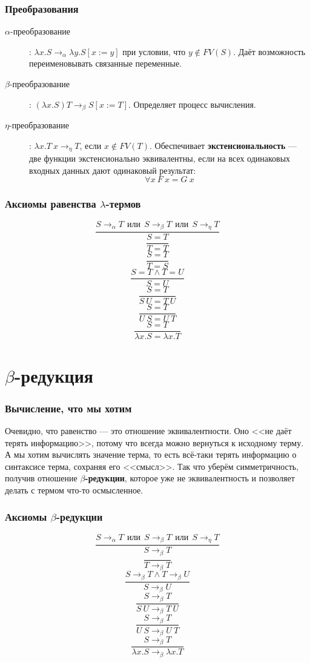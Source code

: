 \documentclass[xetex,mathserif,serif]{beamer}
\begin{document}
	\begin{frame}
		\frametitle{Преобразования}
		\begin{description}
			\item [$\alpha$-преобразование]: $\lambda x.S \rightarrow_\alpha 
					\lambda y.S[x := y]$ при условии, что $y \notin FV(S)$. 
					Даёт возможность переименовывать связанные переменные.
			\item [$\beta$-преобразование]: $(\lambda x.S) T \rightarrow_\beta S[x := T]$.
					Определяет процесс вычисления.
			\item [$\eta$-преобразование]: $\lambda x.T\ x \rightarrow_\eta T$, 
					если $x \notin FV(T)$. Обеспечивает	\textbf{экстенсиональность} 
					--- две функции экстенсионально эквивалентны, если на всех
					одинаковых входных данных дают одинаковый результат:
					$$\forall x\ F\ x = G\ x$$
		\end{description}
	\end{frame}

	\begin{frame}
		\frametitle{Аксиомы равенства $\lambda$-термов}
		$$\dfrac{S \rightarrow_\alpha T\ \ 
			\mbox{или}\ \ S \rightarrow_\beta T\ \ 
			\mbox{или}\ \  S \rightarrow_\eta T}{S = T}$$
		$$\dfrac{}{T = T}$$
		$$\dfrac{S = T}{T = S}$$
		$$\dfrac{S = T \wedge T = U}{S = U}$$
		$$\dfrac{S = T}{S\ U = T\ U}$$
		$$\dfrac{S = T}{U\ S = U\ T}$$
		$$\dfrac{S = T}{\lambda x.S = \lambda x.T}$$
	\end{frame}
	
	\section{$\beta$-редукция}

	\begin{frame}
		\frametitle{Вычисление, что мы хотим}
		Очевидно, что равенство --- это отношение эквивалентности. Оно <<не даёт терять
		информацию>>, потому что всегда можно вернуться к исходному терму. А мы хотим 
		вычислять значение терма, то есть всё-таки терять информацию о синтаксисе 
		терма, сохраняя	его <<смысл>>. Так что уберём симметричность, получив 
		отношение \textbf{$\beta$-редукции}, которое уже не эквивалентность и позволяет 
		делать с термом что-то осмысленное.
	\end{frame}

	\begin{frame}
		\frametitle{Аксиомы $\beta$-редукции}
		$$\dfrac{S \rightarrow_\alpha T\ \ 
			\mbox{или}\ \ S \rightarrow_\beta T\ \ 
			\mbox{или}\ \  S \rightarrow_\eta T}{S \rightarrow_\beta T}$$ 
		$$\dfrac{}{T \rightarrow_\beta T}$$
		$$\dfrac{S \rightarrow_\beta T \wedge T \rightarrow_\beta U}{S \rightarrow_\beta U}$$
		$$\dfrac{S \rightarrow_\beta T}{S\ U \rightarrow_\beta T\ U}$$
		$$\dfrac{S \rightarrow_\beta T}{U\ S \rightarrow_\beta U\ T}$$
		$$\dfrac{S \rightarrow_\beta T}{\lambda x.S \rightarrow_\beta \lambda x.T}$$
	\end{frame}
\end{document}
